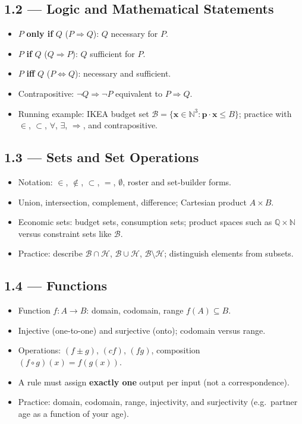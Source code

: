 \documentclass[11pt,a4paper]{article}
\begin{document}
\subsection{1.2 --- Logic and Mathematical Statements}
\begin{itemize}[leftmargin=*]
    \item $P$ \textbf{only if} $Q$ ($P\Rightarrow Q$): $Q$ necessary for $P$.
    \item $P$ \textbf{if} $Q$ ($Q\Rightarrow P$): $Q$ sufficient for $P$.
    \item $P$ \textbf{iff} $Q$ ($P\Leftrightarrow Q$): necessary and sufficient.
    \item Contrapositive: $\neg Q\Rightarrow\neg P$ equivalent to $P\Rightarrow Q$.
    \item Running example: IKEA budget set
      $\mathcal{B}=\{\mathbf{x}\in\mathbb{N}^3:\mathbf{p}\cdot\mathbf{x}\le B\}$;
      practice with $\in$, $\subset$, $\forall$, $\exists$, $\Rightarrow$, and contrapositive.
\end{itemize}

\subsection{1.3 --- Sets and Set Operations}
\begin{itemize}[leftmargin=*]
    \item Notation: $\in$, $\notin$, $\subset$, $=$, $\emptyset$, roster and set-builder forms.
    \item Union, intersection, complement, difference; Cartesian product $A\times B$.
    \item Economic sets: budget sets, consumption sets; product spaces such as
      $\mathbb{Q}\times\mathbb{N}$ versus constraint sets like $\mathcal{B}$.
    \item Practice: describe $\mathcal{B}\cap\mathcal{H}$, $\mathcal{B}\cup\mathcal{H}$,
      $\mathcal{B}\setminus\mathcal{H}$; distinguish elements from subsets.
\end{itemize}

\subsection{1.4 --- Functions}
\begin{itemize}[leftmargin=*]
    \item Function $f\colon A\to B$: domain, codomain, range $f(A)\subseteq B$.
    \item Injective (one-to-one) and surjective (onto); codomain versus range.
    \item Operations: $(f\pm g)$, $(cf)$, $(fg)$, composition $(f\circ g)(x)=f(g(x))$.
    \item A rule must assign \textbf{exactly one} output per input (not a correspondence).
    \item Practice: domain, codomain, range, injectivity, and surjectivity
      (e.g.\ partner age as a function of your age).
\end{itemize}
\end{document}
